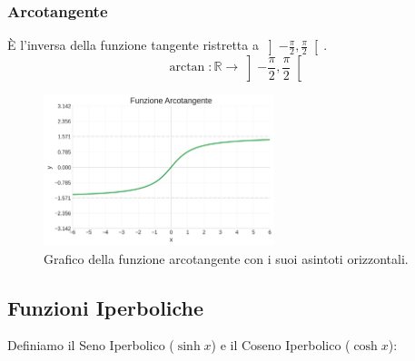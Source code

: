 \subsubsection{Arcotangente}
È l'inversa della funzione tangente ristretta a \(\left]-\frac{\pi}{2}, \frac{\pi}{2}\right[\).
\[ \arctan: \mathbb{R} \rightarrow \left]-\frac{\pi}{2}, \frac{\pi}{2}\right[ \]

\begin{figure}[H]
    \centering
    \includegraphics[width=0.6\textwidth]{./img/arcotangente.png}
    \caption{Grafico della funzione arcotangente con i suoi asintoti orizzontali.}
    \label{fig:arcotangente}
\end{figure}
\FloatBarrier

\subsection{Funzioni Iperboliche}
Definiamo il Seno Iperbolico ($\sinh x$) e il Coseno Iperbolico ($\cosh x$):

